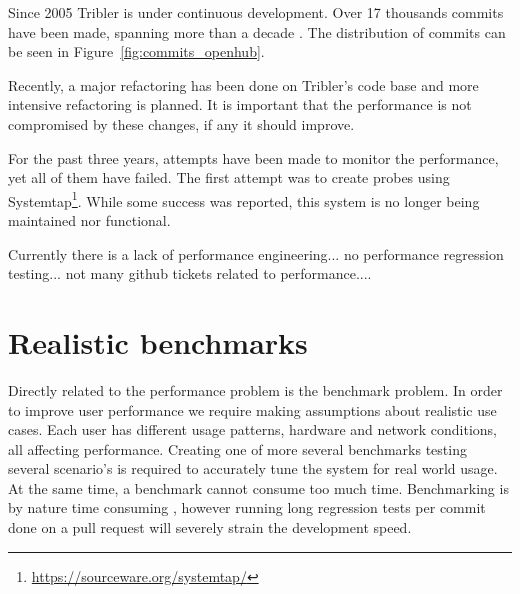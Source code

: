 Since 2005 Tribler is under continuous development.
Over 17 thousands commits have been made, spanning more than a decade \cite{openhub2016tribler}.
The distribution of commits can be seen in Figure~\ref{fig:commits_openhub}.

Recently, a major refactoring has been done on Tribler's code base and more intensive refactoring is planned.
It is important that the performance is not compromised by these changes, if any it should improve.

For the past three years, attempts have been made to monitor the performance, yet all of them have failed.
The first attempt was to create probes using Systemtap\footnote{\url{https://sourceware.org/systemtap/}}.
While some success was reported, this system is no longer being maintained nor functional.


Currently there is a lack of performance engineering... no performance regression testing... not many github tickets related to performance....




\section{Realistic benchmarks}
Directly related to the performance problem is the benchmark problem.
In order to improve user performance we require making assumptions about realistic use cases.
Each user has different usage patterns, hardware and network conditions, all affecting performance.
Creating one of more several benchmarks testing several scenario's is required to accurately tune the system for real world usage.
At the same time, a benchmark cannot consume too much time.
Benchmarking is by nature time consuming \cite{huang2014performance}, however running long regression tests per commit done on a pull request will severely strain the development speed.

